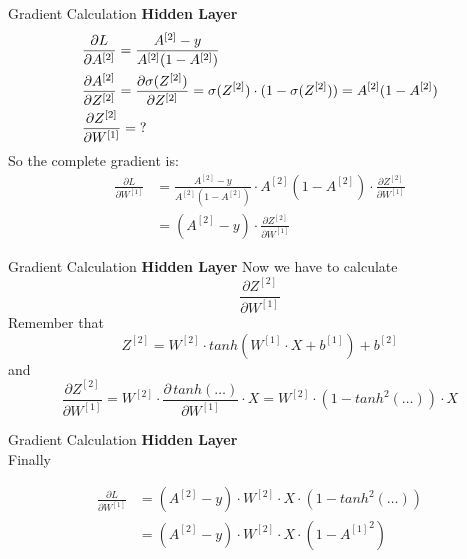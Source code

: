 \documentclass[11pt]{beamer}
\begin{document}
\begin{frame}{Gradient Calculation}
\textbf{Hidden Layer}
\begin{align*}
& \frac{\partial L}{\partial A^{[2]}} = \frac{A^{[2]} - y}{A^{[2]}(1 - A^{[2]})} \notag\\
& \frac{\partial A^{[2]}}{\partial Z^{[2]}} = \frac{\partial \sigma(Z^{[2]})}{\partial Z^{[2]}} = \sigma(Z^{[2]}) \cdot (1 - \sigma(Z^{[2]})) 
= A^{[2]} (1 - A^{[2]}) \\
& \frac{\partial Z^{[2]}}{\partial W^{[1]}} = \mathbf{?} 
\end{align*}
So the complete gradient is:
\begin{align*}
\frac{\partial L}{\partial W^{[1]}} &=  
\frac{A^{[2]} - y}{A^{[2]}(1 - A^{[2]})} \cdot 
A^{[2]} (1 - A^{[2]}) \cdot \frac{\partial Z^{[2]}}{\partial W^{[1]}} \\
&= (A^{[2]} - y) \cdot \frac{\partial Z^{[2]}}{\partial W^{[1]}}
\end{align*}
\end{frame}
\begin{frame}{Gradient Calculation}
\textbf{Hidden Layer}
Now we have to calculate
$$\frac{\partial Z^{[2]}}{\partial W^{[1]}}$$
Remember that
$$Z^{[2]} = W^{[2]} \cdot tanh\left( W^{[1]} \cdot X + b^{[1]} \right) + b^{[2]}$$
and
$$\frac{\partial Z^{[2]}}{\partial W^{[1]}} = W^{[2]} \cdot \frac{\partial \, tanh(\dots)}{\partial W^{[1]}} \cdot X = W^{[2]} \cdot \left( 1 - tanh^2(\dots) \right) \cdot X$$
\end{frame}
\begin{frame}{Gradient Calculation}
\textbf{Hidden Layer}\\
\vspace{0.5cm}
Finally
\begin{tcolorbox}
\begin{align*}
\frac{\partial L}{\partial W^{[1]}} &= (A^{[2]} - y) \cdot W^{[2]} \cdot X \cdot \left( 1 - tanh^2(\dots) \right) \\
&= (A^{[2]} - y) \cdot W^{[2]} \cdot X \cdot \left( 1 - {A^{[1]}}^2 \right)
\end{align*}
\end{tcolorbox}
\end{frame}
\end{document}
